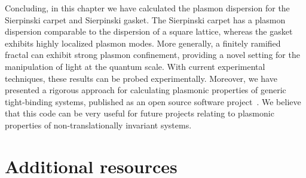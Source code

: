 Concluding, in this chapter we have calculated the plasmon dispersion for the Sierpinski carpet and Sierpinski gasket. The Sierpinski carpet has a plasmon dispersion comparable to the dispersion of a square lattice, whereas the gasket exhibits highly localized plasmon modes. More generally, a finitely ramified fractal can exhibit strong plasmon confinement, providing a novel setting for the manipulation of light at the quantum scale. With current experimental techniques, these results can be probed experimentally. Moreover, we have presented a rigorous approach for calculating plasmonic properties of generic tight-binding systems, published as an open source software project~\cite{Westerhout2017}. We believe that this code can be very useful for future projects relating to plasmonic properties of non-translationally invariant systems.

\section{Additional resources}


